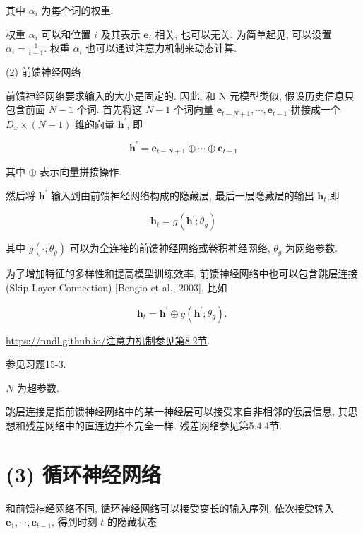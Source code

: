 \documentclass[10pt]{article}
\begin{document}
其中 $\alpha_{i}$ 为每个词的权重.

权重 $\alpha_{i}$ 可以和位置 $i$ 及其表示 $\boldsymbol{e}_{i}$ 相关, 也可以无关. 为简单起见, 可以设置 $\alpha_{i}=\frac{1}{t-1}$. 权重 $\alpha_{i}$ 也可以通过注意力机制来动态计算.

(2) 前馈神经网络

前馈神经网络要求输入的大小是固定的. 因此, 和 $\mathrm{N}$ 元模型类似, 假设历史信息只包含前面 $N-1$ 个词. 首先将这 $N-1$ 个词向量 $\boldsymbol{e}_{t-N+1}, \cdots, \boldsymbol{e}_{t-1}$ 拼接成一个 $D_{x} \times(N-1)$ 维的向量 $\boldsymbol{h}^{\prime}$, 即


\begin{equation*}
\boldsymbol{h}^{\prime}=\boldsymbol{e}_{t-N+1} \oplus \cdots \oplus \boldsymbol{e}_{t-1} \tag{15.25}
\end{equation*}


其中 $\oplus$ 表示向量拼接操作.

然后将 $\boldsymbol{h}^{\prime}$ 输入到由前馈神经网络构成的隐藏层, 最后一层隐藏层的输出 $\boldsymbol{h}_{t}$,即


\begin{equation*}
\boldsymbol{h}_{t}=g\left(\boldsymbol{h}^{\prime} ; \theta_{g}\right) \tag{15.26}
\end{equation*}


其中 $g\left(\cdot ; \theta_{g}\right)$ 可以为全连接的前馈神经网络或卷积神经网络, $\theta_{g}$ 为网络参数.

为了增加特征的多样性和提高模型训练效率, 前馈神经网络中也可以包含跳层连接 (Skip-Layer Connection) [Bengio et al., 2003], 比如


\begin{equation*}
\boldsymbol{h}_{t}=\boldsymbol{h}^{\prime} \oplus g\left(\boldsymbol{h}^{\prime} ; \theta_{g}\right) \text {. } \tag{15.27}
\end{equation*}


\href{https://nndl.github.io/%E6%B3%A8%E6%84%8F%E5%8A%9B%E6%9C%BA%E5%88%B6%E5%8F%82%E8%A7%81%E7%AC%AC8.2%E8%8A%82}{https://nndl.github.io/注意力机制参见第8.2节}.

参见习题15-3.

$N$ 为超参数.

跳层连接是指前馈神经网络中的某一神经层可以接受来自非相邻的低层信息, 其思想和残差网络中的直连边并不完全一样. 残差网络参见第5.4.4节.

\section*{(3) 循环神经网络}
和前馈神经网络不同, 循环神经网络可以接受变长的输入序列, 依次接受输入 $\boldsymbol{e}_{1}, \cdots, \boldsymbol{e}_{t-1}$, 得到时刻 $t$ 的隐藏状态
\end{document}
